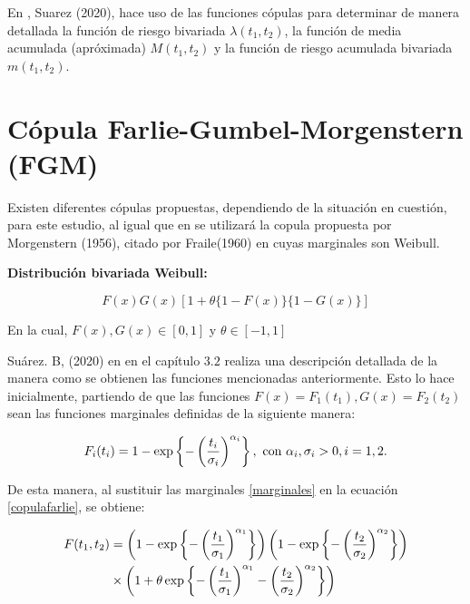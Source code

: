 En \cite{tesisbiviana}, Suarez (2020), hace uso de las funciones cópulas para determinar de manera detallada la función de riesgo bivariada $\lambda(t_1,t_2)$, la función de media acumulada (apróximada) $M(t_1,t_2)$ y la función de riesgo acumulada bivariada $m(t_1,t_2)$. 


\section{Cópula Farlie-Gumbel-Morgenstern (FGM)}

Existen diferentes cópulas propuestas, dependiendo de la situación en cuestión, para este estudio, al igual que en \cite{tesisbiviana} se utilizará la copula propuesta por Morgenstern (1956), citado por Fraile(1960) en \cite{farlie} cuyas marginales son Weibull. 

\textbf{Distribución bivariada Weibull:}


\begin{equation}
\label{copulafarlie}
F(x)G(x)[1+\theta\{1-F(x)\}\{1-G(x)\}]
\end{equation}

En la cual, $F(x), G(x) \in [0,1]$ y $\theta\in [-1,1]$

Suárez. B, (2020) en \cite{tesisbiviana} en el capítulo $3.2$ realiza una descripción detallada de la manera como se obtienen las funciones mencionadas anteriormente. Esto lo hace inicialmente, partiendo de que las funciones $F(x)=F_1(t_1), G(x)=F_2(t_2)$ sean las funciones marginales definidas de la siguiente manera: 

\begin{equation}
\label{marginales}
F_i(t_i)=1-\exp\left\lbrace-\left(\frac{t_i}{\sigma_i}\right)^{\alpha_i}\right\rbrace, \text{ con } \alpha_i, \sigma_i >0, i=1,2.
\end{equation}

De esta manera, al sustituir las marginales \ref{marginales} en la ecuación \ref{copulafarlie}, se obtiene: 

\begin{equation}
\label{funcionF}
\begin{split}
F(t_1,t_2) & = \left(1-\exp\left\lbrace-\left(\frac{t_1}{\sigma_1}\right)^{\alpha_1}\right\rbrace\right)\left(1-\exp\left\lbrace-\left(\frac{t_2}{\sigma_2}\right)^{\alpha_2}\right\rbrace\right)\\
 & \times \left(1+\theta\exp\left\lbrace-\left(\frac{t_1}{\sigma_1}\right)^{\alpha_1}-\left(\frac{t_2}{\sigma_2}\right)^{\alpha_2}\right\rbrace\right)
\end{split}
\end{equation}


